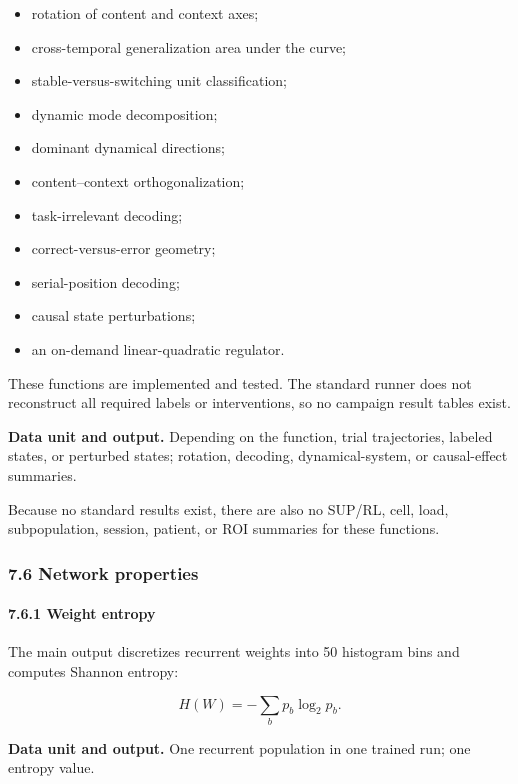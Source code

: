 \documentclass[
  10pt,
]{article}
\providecommand{\tightlist}{%
  \setlength{\itemsep}{0pt}\setlength{\parskip}{0pt}}
\begin{document}
\begin{itemize}
\tightlist
\item
  rotation of content and context axes;
\item
  cross-temporal generalization area under the curve;
\item
  stable-versus-switching unit classification;
\item
  dynamic mode decomposition;
\item
  dominant dynamical directions;
\item
  content--context orthogonalization;
\item
  task-irrelevant decoding;
\item
  correct-versus-error geometry;
\item
  serial-position decoding;
\item
  causal state perturbations;
\item
  an on-demand linear-quadratic regulator.
\end{itemize}

These functions are implemented and tested. The standard runner does not
reconstruct all required labels or interventions, so no campaign result
tables exist.

\textbf{Data unit and output.} Depending on the function, trial
trajectories, labeled states, or perturbed states; rotation, decoding,
dynamical-system, or causal-effect summaries.

Because no standard results exist, there are also no SUP/RL, cell, load,
subpopulation, session, patient, or ROI summaries for these functions.

\hypertarget{network-properties}{%
\subsubsection{7.6 Network properties}\label{network-properties}}

\hypertarget{weight-entropy}{%
\paragraph{7.6.1 Weight entropy}\label{weight-entropy}}

The main output discretizes recurrent weights into 50 histogram bins and
computes Shannon entropy:

\[
H(W)=-\sum_b p_b\log_2p_b.
\]

\textbf{Data unit and output.} One recurrent population in one trained
run; one entropy value.
\end{document}
